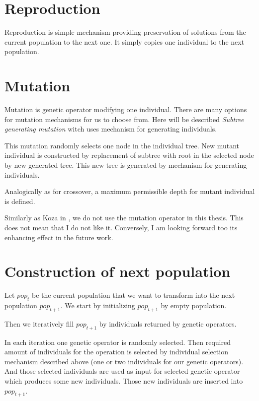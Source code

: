 \documentclass[12pt,a4paper]{report}
\begin{document}
\section{Reproduction}

Reproduction is simple mechanism providing preservation of solutions
from the current population to the next one. It simply copies 
one individual to the next population.

\section{Mutation}

Mutation is genetic operator modifying one individual.
There are many options for mutation mechanisms 
for us to choose from. Here will be described 
\textit{Subtree generating mutation} 
witch uses mechanism for generating individuals.

This mutation randomly selects one node in the individual tree.
New mutant individual is constructed by replacement of 
subtree with root in the selected node by new generated
tree. This new tree is generated by mechanism for generating 
individuals.

Analogically as for crossover, a maximum permissible depth for mutant individual 
is defined.

Similarly as Koza in \cite{koza92}, we do not use the mutation operator
in this thesis. This does not mean that I do not like it. 
Conversely, I am looking forward too its enhancing effect in the future work.

\section{Construction of next population}

Let $pop_{t}$ be the current population that we want to 
transform into the next population $pop_{t+1}$. 
We start by initializing $pop_{t+1}$ by empty population.

Then we iteratively fill $pop_{t+1}$ by individuals 
returned by genetic operators.

In each iteration one genetic operator is randomly selected.
Then required amount of individuals for the operation is selected
by individual selection mechanism described above (one or two
individuals for our genetic operators).
And those selected individuals are used as input for selected
genetic operator which produces some new individuals.
Those new individuals are inserted into $pop_{t+1}$.
\end{document}
